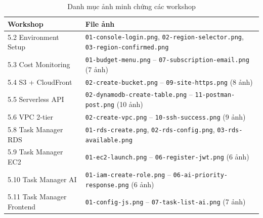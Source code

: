 \documentclass[13pt]{extarticle}
\begin{document}
\begin{longtable}{p{5.5cm}p{8cm}}
\caption{Danh mục ảnh minh chứng các workshop}
\label{tab:images} \\
\toprule
\textbf{Workshop} & \textbf{File ảnh} \\
\midrule
\endhead
5.2 Environment Setup & \texttt{01-console-login.png}, \texttt{02-region-selector.png}, \texttt{03-region-confirmed.png} \\
5.3 Cost Monitoring & \texttt{01-budget-menu.png} -- \texttt{07-subscription-email.png} (7 ảnh) \\
5.4 S3 + CloudFront & \texttt{02-create-bucket.png} -- \texttt{09-site-https.png} (8 ảnh) \\
5.5 Serverless API & \texttt{02-dynamodb-create-table.png} -- \texttt{11-postman-post.png} (10 ảnh) \\
5.6 VPC 2-tier & \texttt{02-create-vpc.png} -- \texttt{10-ssh-success.png} (9 ảnh) \\
5.8 Task Manager RDS & \texttt{01-rds-create.png}, \texttt{02-rds-config.png}, \texttt{03-rds-available.png} \\
5.9 Task Manager EC2 & \texttt{01-ec2-launch.png} -- \texttt{06-register-jwt.png} (6 ảnh) \\
5.10 Task Manager AI & \texttt{01-iam-create-role.png} -- \texttt{06-ai-priority-response.png} (6 ảnh) \\
5.11 Task Manager Frontend & \texttt{01-config-js.png} -- \texttt{07-task-list-ai.png} (7 ảnh) \\
\bottomrule
\end{longtable}
\end{document}
